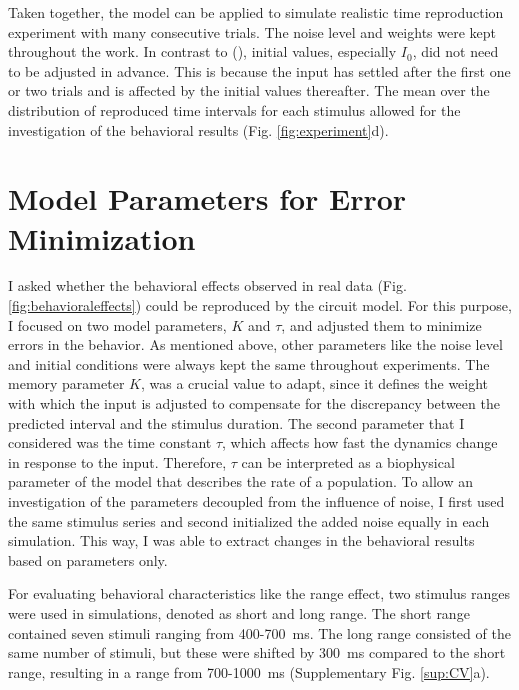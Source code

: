 \documentclass[10pt, a4paper]{article}
\begin{document}
Taken together, the model can be applied to simulate realistic time reproduction experiment with many consecutive trials. The noise level and weights were kept throughout the work. 
In contrast to \citeauthor{Egger2020} (\citeyear{Egger2020}), initial values, especially $I_0$, did not need to be adjusted in advance. 
This is because the input has settled after the first one or two trials and is affected by the initial values thereafter.
The mean over the distribution of reproduced time intervals for each stimulus allowed for the investigation of the behavioral results (Fig. \ref{fig:experiment}d). 

\section{Model Parameters for Error Minimization}
I asked whether the behavioral effects observed in real data (Fig. \ref{fig:behavioraleffects}) could be reproduced by the circuit model.
For this purpose, I focused on two model parameters, $K$ and $\tau$, and adjusted them to minimize errors in the behavior. 
As mentioned above, other parameters like the noise level and initial conditions were always kept the same throughout experiments. 
The memory parameter $K$, was a crucial value to adapt, since it defines the weight with which the input is adjusted to compensate for the discrepancy between the predicted interval and the stimulus duration.
The second parameter that I considered was the time constant $\tau$, which affects how fast the dynamics change in response to the input. Therefore, $\tau$ can be interpreted as a biophysical parameter of the model that describes the rate of a population.
To allow an investigation of the parameters decoupled from the influence of noise, I first used the same stimulus series and second initialized the added noise equally in each simulation. This way, I was able to extract changes in the behavioral results based on parameters only.

For evaluating behavioral characteristics like the range effect, two stimulus ranges were used in simulations, denoted as short and long range. 
The short range contained seven stimuli ranging from 400-700~ms. 
The long range consisted of the same number of stimuli, but these were shifted by 300~ms compared to the short range, resulting in a range from 700-1000~ms (Supplementary Fig. \ref{sup:CV}a).
 
\end{document}

